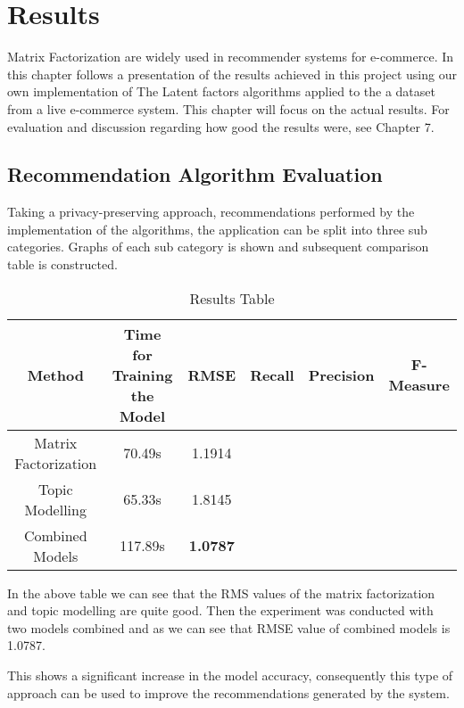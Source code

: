 \chapter{Results}
Matrix Factorization are widely used in recommender systems for e-commerce. In this chapter follows a presentation of the results achieved in this project using our own implementation of The Latent factors algorithms applied to the a dataset from a live e-commerce system. This chapter will focus on the actual results. For evaluation and discussion regarding how good the results were, see Chapter 7.

\section{Recommendation Algorithm Evaluation}
Taking a privacy-preserving approach, recommendations performed by the implementation of the algorithms, the application can be split into three sub categories. Graphs of each sub category is shown and subsequent comparison table is constructed.


\begin{table}[h]
\centering
\begin{tabular}{| c | c | c | c | c | c |}
\hline
\textbf{Method} & \textbf{Time for Training the Model} & \textbf{RMSE} & \textbf{Recall} & \textbf{Precision} & \textbf{F-Measure} \\
\hline
Matrix Factorization & 70.49s & 1.1914 &  &    &   \\
\hline
Topic Modelling & 65.33s & 1.8145 &  &  &  \\
\hline
Combined Models & 117.89s  & \textbf{1.0787} &  &  &  \\ 
\hline          
\end{tabular}
\caption{Results Table}
\label{Results Table}
\end{table}

In the above table we can see that the RMS values of the matrix factorization and topic modelling are quite good.
Then the experiment was conducted with two models combined and as we can see that RMSE value of combined models is 1.0787.

This shows a significant increase in the model accuracy, consequently this type of approach can be used to improve the recommendations generated by the system.

